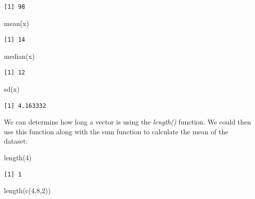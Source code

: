 \documentclass[
  letterpaper,
  DIV=11,
  numbers=noendperiod]{scrreprt}
\newenvironment{Shaded}{\begin{snugshade}}{\end{snugshade}}
\newcommand{\DecValTok}[1]{\textcolor[rgb]{0.68,0.00,0.00}{#1}}
\newcommand{\FunctionTok}[1]{\textcolor[rgb]{0.28,0.35,0.67}{#1}}
\newcommand{\NormalTok}[1]{\textcolor[rgb]{0.00,0.23,0.31}{#1}}
\begin{document}
\begin{verbatim}
[1] 98
\end{verbatim}

\begin{Shaded}
\begin{Highlighting}[]
\FunctionTok{mean}\NormalTok{(x)}
\end{Highlighting}
\end{Shaded}

\begin{verbatim}
[1] 14
\end{verbatim}

\begin{Shaded}
\begin{Highlighting}[]
\FunctionTok{median}\NormalTok{(x)}
\end{Highlighting}
\end{Shaded}

\begin{verbatim}
[1] 12
\end{verbatim}

\begin{Shaded}
\begin{Highlighting}[]
\FunctionTok{sd}\NormalTok{(x)}
\end{Highlighting}
\end{Shaded}

\begin{verbatim}
[1] 4.163332
\end{verbatim}

We can determine how long a vector is using the \textit{length()}
function. We could then use this function along with the sum function to
calculate the mean of the dataset:

\begin{Shaded}
\begin{Highlighting}[]
\FunctionTok{length}\NormalTok{(}\DecValTok{4}\NormalTok{)}
\end{Highlighting}
\end{Shaded}

\begin{verbatim}
[1] 1
\end{verbatim}

\begin{Shaded}
\begin{Highlighting}[]
\FunctionTok{length}\NormalTok{(}\FunctionTok{c}\NormalTok{(}\DecValTok{4}\NormalTok{,}\DecValTok{8}\NormalTok{,}\DecValTok{2}\NormalTok{))}
\end{Highlighting}
\end{Shaded}
\end{document}
